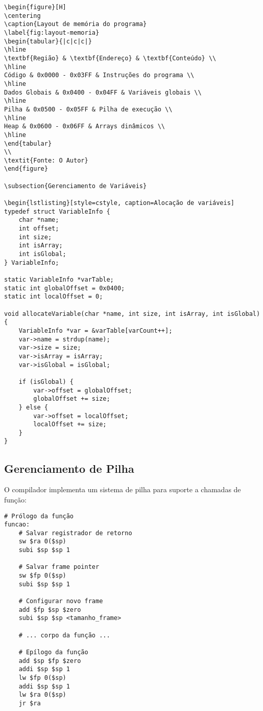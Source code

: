 \documentclass[
	12pt,				%
	oneside,
	a4paper,			%
	english,			%
	french,				%
	spanish,			%
	brazil,				%
	]{abntex2}
\begin{document}
\begin{lstlisting}[style=cstyle, caption=Codificação binária das instruções]
\begin{figure}[H]
\centering
\caption{Layout de memória do programa}
\label{fig:layout-memoria}
\begin{tabular}{|c|c|c|}
\hline
\textbf{Região} & \textbf{Endereço} & \textbf{Conteúdo} \\
\hline
Código & 0x0000 - 0x03FF & Instruções do programa \\
\hline
Dados Globais & 0x0400 - 0x04FF & Variáveis globais \\
\hline
Pilha & 0x0500 - 0x05FF & Pilha de execução \\
\hline
Heap & 0x0600 - 0x06FF & Arrays dinâmicos \\
\hline
\end{tabular}
\\
\textit{Fonte: O Autor}
\end{figure}

\subsection{Gerenciamento de Variáveis}

\begin{lstlisting}[style=cstyle, caption=Alocação de variáveis]
typedef struct VariableInfo {
    char *name;
    int offset;
    int size;
    int isArray;
    int isGlobal;
} VariableInfo;

static VariableInfo *varTable;
static int globalOffset = 0x0400;
static int localOffset = 0;

void allocateVariable(char *name, int size, int isArray, int isGlobal) {
    VariableInfo *var = &varTable[varCount++];
    var->name = strdup(name);
    var->size = size;
    var->isArray = isArray;
    var->isGlobal = isGlobal;
    
    if (isGlobal) {
        var->offset = globalOffset;
        globalOffset += size;
    } else {
        var->offset = localOffset;
        localOffset += size;
    }
}
\end{lstlisting}

\subsection{Gerenciamento de Pilha}

O compilador implementa um sistema de pilha para suporte a chamadas de função:

\begin{lstlisting}[style=assemblystyle, caption=Convenção de chamada de função]
# Prólogo da função
funcao:
    # Salvar registrador de retorno
    sw $ra 0($sp)
    subi $sp $sp 1
    
    # Salvar frame pointer
    sw $fp 0($sp)
    subi $sp $sp 1
    
    # Configurar novo frame
    add $fp $sp $zero
    subi $sp $sp <tamanho_frame>
    
    # ... corpo da função ...
    
    # Epílogo da função
    add $sp $fp $zero
    addi $sp $sp 1
    lw $fp 0($sp)
    addi $sp $sp 1
    lw $ra 0($sp)
    jr $ra
\end{lstlisting}
\end{document}
